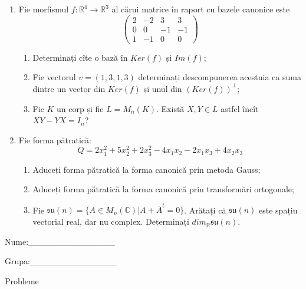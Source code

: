 \documentclass{article}
\begin{document}
\begin{enumerate}
 \item Fie morfismul $f:\mathbb{R}^4 \to \mathbb{R}^3$ al cărui matrice în raport cu bazele canonice este
$$\begin{pmatrix}
2&-2&3&3\\
0&0&-1&-1\\
1&-1&0&0
\end{pmatrix}$$

\begin{enumerate}
\item Determinați cîte o bază în $Ker(f)$ și $Im(f)$;
\item Fie vectorul $v=(1,3,1,3)$ determinați descompunerea acestuia ca suma dintre un vector din $Ker(f)$ și unul din $(Ker(f))^\perp$;
\item Fie $K$ un corp și fie $L=M_n(K)$. Există $X,Y \in L$ astfel încît $XY-YX=I_n$?  
\end{enumerate}
\item Fie forma pătratică:
$$Q= 2x_1^2+5x_2^2+2x_3^2-4x_1x_2-2x_1x_3+4x_2x_3$$

\begin{enumerate}
\item Aduceți forma pătratică la forma canonică prin metoda Gauss;
\item Aduceți forma pătratică la forma canonică prin transformări ortogonale;
\item Fie $\mathfrak{su}(n)=\{ A \in M_n(\mathbb{C}) | A+\bar{A}^t=0\}$. Arătați că $\mathfrak{su}(n)$ este spațiu vectorial real, dar nu complex.
Determinați $dim_{\mathbb{R}}\mathfrak{su}(n)$.
\end{enumerate}
\end{enumerate}
\newpage
\begin{flushright}
Nume:\_\_\_\_\_\_\_\_\_\_\_\_\_\_
 
 
Grupa:\_\_\_\_\_\_\_\_\_\_\_\_\_\_
\end{flushright}
\begin{center}
\vspace{2cm}
{\Large Probleme}
\vspace{2cm}
\end{center}
\end{document}
